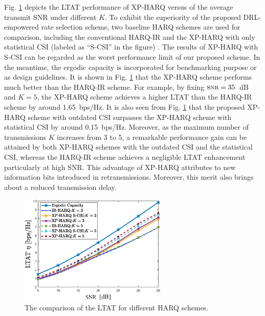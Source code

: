 \documentclass[lettersize,journal]{IEEEtran}
\begin{document}
Fig. \ref{Fig.throughputs} depicts the LTAT performance of XP-HARQ versus of the average transmit SNR under different $K$. To exhibit the superiority of the proposed DRL-empowered rate selection scheme, two baseline HARQ schemes are used for comparison, including the conventional HARQ-IR \cite{7959548} %
 and the XP-HARQ with only statistical CSI (labeled as ``S-CSI'' in the figure) \cite{9768121}. The results of XP-HARQ with S-CSI can be regarded as the worst performance limit of our proposed scheme. In the meantime, the ergodic capacity is incorporated for benchmarking purpose or as design guidelines. It is shown in Fig. \ref{Fig.throughputs} that the XP-HARQ scheme performs much better than the HARQ-IR scheme. For example, by fixing ${ \textsc{snr}} = 35$~dB and $K=5$, the XP-HARQ scheme achieves a higher LTAT than the HARQ-IR scheme by around 1.65~bps/Hz. It is also seen from Fig. \ref{Fig.throughputs} that the proposed XP-HARQ scheme with outdated CSI surpasses the XP-HARQ scheme with statistical CSI by around 0.15~bps/Hz. Moreover, as the maximum number of transmissions $K$ increases from 3 to 5, a remarkable performance gain can be attained by both XP-HARQ schemes with the outdated CSI and the statistical CSI, whereas the HARQ-IR scheme achieves a negligible LTAT enhancement particularly at high SNR. This advantage of XP-HARQ attributes to new information bits introduced in retransmissions. Moreover, this merit also brings about a reduced transmission delay.%



\begin{figure}[htbp]
    \centering
    \includegraphics[width=7cm]{Throughput_Power_All.eps}
    \caption{The comparison of the LTAT for different HARQ schemes.}
    \label{Fig.throughputs} %
\end{figure}
\end{document}
